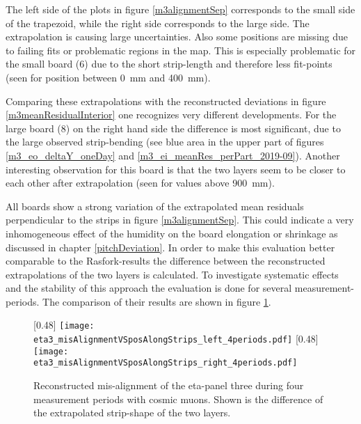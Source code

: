 \documentclass[
twoside,            %
BCOR1.4cm,          %
10pt,               %
headings=normal,    %
headsepline,        %
clearplainpage,		%
final,              %
div=14,
open=right,
bibliography=toc
]{scrreprt}
\begin{document}
The left side of the plots in figure \ref{m3alignmentSep} corresponds to the small side of the trapezoid, while the right side corresponds to the large side.
The extrapolation is causing large uncertainties.
Also some positions are missing due to failing fits or problematic regions in the map.
This is especially problematic for the small board (6) due to the short strip-length and therefore less fit-points (seen for position between \SI{0}{mm} and \SI{400}{mm}).

Comparing these extrapolations with the reconstructed deviations in figure \ref{m3meanResidualInterior} one recognizes very different developments.
For the large board (8) on the right hand side the difference is most significant, due to the large observed strip-bending (see blue area in the upper part of figures \ref{m3_eo_deltaY_oneDay} and \ref{m3_ei_meanRes_perPart_2019-09}).
Another interesting observation for this board is that the two layers seem to be closer to each other after extrapolation (seen for values above \SI{900}{mm}).

All boards show a strong variation of the extrapolated mean residuals perpendicular to the strips in figure \ref{m3alignmentSep}.
This could indicate a very inhomogeneous effect of the humidity on the board elongation or shrinkage as discussed in chapter \ref{pitchDeviation}.
In order to make this evaluation better comparable to the Rasfork-results the difference between the reconstructed extrapolations of the two layers is calculated.
To investigate systematic effects and the stability of this approach the evaluation is done for several measurement-periods.
The comparison of their results are shown in figure \ref{eta3misAlignment}.

\begin{figure}[!h]
	[0.48\textwidth]
	{\texttt{[image: eta3\_misAlignmentVSposAlongStrips\_left\_4periods.pdf]}}
	\hfill
	[0.48\textwidth]
	{\texttt{[image: eta3\_misAlignmentVSposAlongStrips\_right\_4periods.pdf]}}
	\vspace{-2mm}
	\caption{
		Reconstructed mis-alignment of the eta-panel three during four measurement periods with cosmic muons.
		Shown is the difference of the extrapolated strip-shape of the two layers.
	}
	\label{eta3misAlignment}
\end{figure}
\end{document}
